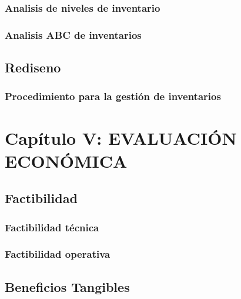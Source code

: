 \documentclass[11pt]{article}
\begin{document}
\hypertarget{analisis-de-niveles-de-inventario-1}{%
\subsubsection{Analisis de niveles de
inventario}\label{analisis-de-niveles-de-inventario-1}}

\hypertarget{analisis-abc-de-inventarios}{%
\subsubsection{Analisis ABC de
inventarios}\label{analisis-abc-de-inventarios}}

\hypertarget{rediseno}{%
\subsection{Rediseno}\label{rediseno}}

\hypertarget{procedimiento-para-la-gestiuxf3n-de-inventarios}{%
\subsubsection{Procedimiento para la gestión de
inventarios}\label{procedimiento-para-la-gestiuxf3n-de-inventarios}}

\hypertarget{capuxedtulo-v-evaluaciuxf3n-econuxf3mica}{%
\section{Capítulo V: EVALUACIÓN
ECONÓMICA}\label{capuxedtulo-v-evaluaciuxf3n-econuxf3mica}}

\hypertarget{factibilidad}{%
\subsection{Factibilidad}\label{factibilidad}}

\hypertarget{factibilidad-tuxe9cnica}{%
\subsubsection{Factibilidad técnica}\label{factibilidad-tuxe9cnica}}

\hypertarget{factibilidad-operativa}{%
\subsubsection{Factibilidad operativa}\label{factibilidad-operativa}}

\hypertarget{beneficios-tangibles}{%
\subsection{Beneficios Tangibles}\label{beneficios-tangibles}}
\end{document}
